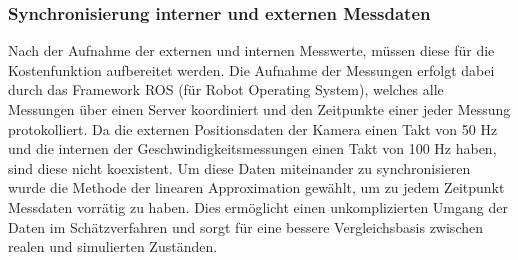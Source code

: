 \subsubsection{Synchronisierung interner und externen Messdaten}
Nach der Aufnahme der externen und internen Messwerte, müssen diese für die Kostenfunktion aufbereitet werden. Die Aufnahme der Messungen erfolgt dabei durch das Framework ROS (für Robot Operating System), welches alle Messungen über einen Server koordiniert und den Zeitpunkte einer jeder Messung protokolliert. Da die externen Positionsdaten der Kamera einen Takt von 50 Hz und die internen der Geschwindigkeitsmessungen einen Takt von 100 Hz haben, sind diese nicht koexistent. Um diese Daten miteinander zu synchronisieren wurde die Methode der linearen Approximation gewählt, um zu jedem Zeitpunkt Messdaten vorrätig zu haben. Dies ermöglicht einen unkomplizierten Umgang der Daten im Schätzverfahren und sorgt für eine bessere Vergleichsbasis zwischen realen und simulierten Zuständen. 

